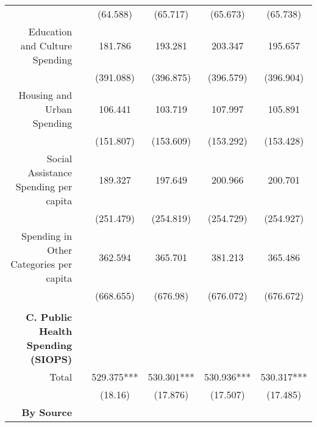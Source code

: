 \begin{table}[h!]
\begin{footnotesize}
\begin{center}
{\begin{threeparttable}[b]
\begin{tabular}{rrrrrr}
          &       & \multicolumn{1}{c}{(64.588)} & \multicolumn{1}{c}{(65.717)} & \multicolumn{1}{c}{(65.673)} & \multicolumn{1}{c}{(65.738)} \\
    \multicolumn{1}{p{23.285em}}{Education and Culture Spending} &       & \multicolumn{1}{c}{181.786} & \multicolumn{1}{c}{193.281} & \multicolumn{1}{c}{203.347} & \multicolumn{1}{c}{195.657} \\
          &       & \multicolumn{1}{c}{(391.088)} & \multicolumn{1}{c}{(396.875)} & \multicolumn{1}{c}{(396.579)} & \multicolumn{1}{c}{(396.904)} \\
    \multicolumn{1}{p{23.285em}}{Housing and Urban Spending} &       & \multicolumn{1}{c}{106.441} & \multicolumn{1}{c}{103.719} & \multicolumn{1}{c}{107.997} & \multicolumn{1}{c}{105.891} \\
          &       & \multicolumn{1}{c}{(151.807)} & \multicolumn{1}{c}{(153.609)} & \multicolumn{1}{c}{(153.292)} & \multicolumn{1}{c}{(153.428)} \\
    \multicolumn{1}{p{23.285em}}{Social Assistance Spending per capita} &       & \multicolumn{1}{c}{189.327} & \multicolumn{1}{c}{197.649} & \multicolumn{1}{c}{200.966} & \multicolumn{1}{c}{200.701} \\
          &       & \multicolumn{1}{c}{(251.479)} & \multicolumn{1}{c}{(254.819)} & \multicolumn{1}{c}{(254.729)} & \multicolumn{1}{c}{(254.927)} \\
    \multicolumn{1}{p{23.285em}}{Spending in Other Categories per capita} &       & \multicolumn{1}{c}{362.594} & \multicolumn{1}{c}{365.701} & \multicolumn{1}{c}{381.213} & \multicolumn{1}{c}{365.486} \\
          &       & \multicolumn{1}{c}{(668.655)} & \multicolumn{1}{c}{(676.98)} & \multicolumn{1}{c}{(676.072)} & \multicolumn{1}{c}{(676.672)} \\
          &       &       &       &       &  \\
    \midrule
    \multicolumn{1}{p{23.285em}}{\textbf{C. Public Health Spending (SIOPS)}} &       &       &       &       &  \\
    \multicolumn{1}{p{23.285em}}{Total} &       & \multicolumn{1}{c}{529.375***} & \multicolumn{1}{c}{530.301***} & \multicolumn{1}{c}{530.936***} & \multicolumn{1}{c}{530.317***} \\
          &       & \multicolumn{1}{c}{(18.16)} & \multicolumn{1}{c}{(17.876)} & \multicolumn{1}{c}{(17.507)} & \multicolumn{1}{c}{(17.485)} \\
    \multicolumn{1}{p{23.285em}}{\textbf{By Source}} &       &       &       &       &  \\

\end{tabular}
\end{threeparttable}}
\end{center}
\end{footnotesize}
\end{table}
